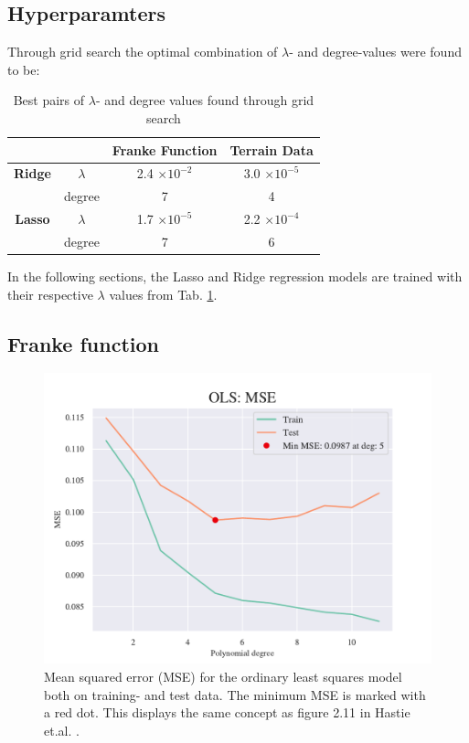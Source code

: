 \subsection{Hyperparamters}

Through grid search the optimal combination of $\lambda$- and degree-values were found to be: 

\begin{table}[h!]
    \centering
    \begin{tabular}{|c|c|c|c|}
        \hline
        & & \textbf{Franke Function} & \textbf{Terrain Data} \\ \hline
        \textbf{Ridge} & $\lambda$ & 2.4 $\times 10^{-2}$ & 3.0 $\times 10^{-5}$ \\ 
         & degree & 7 & 4 \\ \hline
        \textbf{Lasso} & $\lambda$ & 1.7 $\times 10^{-5}$ & 2.2 $\times 10^{-4}$ \\ 
         & degree & 7 & 6 \\ \hline
    \end{tabular}
    \caption{Best pairs of $\lambda$- and degree values found through grid search}
    \label{tab:grid}
\end{table}

In the following sections, the Lasso and Ridge regression models are trained with their respective $\lambda$ values from Tab. \ref{tab:grid}. 

\subsection{Franke function}

\begin{figure}[h!]
    \centering
    \includegraphics[width=1\linewidth]{project_1/figures/figures_in_report/OLS_MSE_Franke_Noise.pdf}
    \caption{Mean squared error (MSE) for the ordinary least squares model both on training- and test data. The minimum MSE is marked with a red dot. This displays the same concept as figure 2.11 in Hastie et.al. \citep[p. 38]{hastie}.}
    \label{fig:mseols}
\end{figure}

